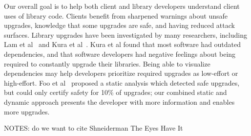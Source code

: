 Our overall goal is to help both client and library developers understand
client uses of library code. Clients benefit from sharpened warnings
about unsafe upgrades, knowledge that some upgrades are safe, and
having reduced attack surfaces. Library upgrades have been
investigated by many researchers, including Lam et
al~\cite{lam20:_puttin_seman_seman_version} and Kura et al~\cite{kula18:_do_devel_updat_their_librar_depen}. Kura et al found that most
software had outdated dependencies, and that software developers had
negative feelings about being required to constantly upgrade their
libraries. Being able to visualize dependencies may help developers
prioritize required upgrades as low-effort or high-effort.
Foo et al~\cite{foo18:_effic_static_check_librar_updat}
proposed a static analysis which detected safe upgrades, but could
only certify safety for 10\% of upgrades; our combined static and
dynamic approach presents the developer with more information and
enables more upgrades. 

NOTES: do we want to cite Shneiderman The Eyes Have It
